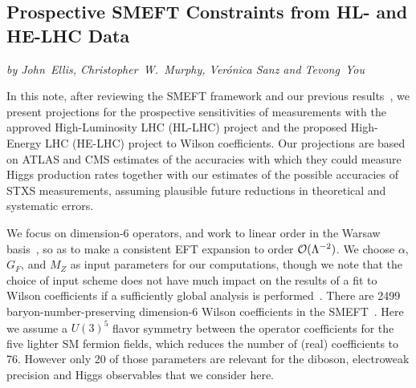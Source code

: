 \documentclass[../report.tex]{subfiles}
\begin{document}
\label{sec8:intro}






\subsection{Prospective SMEFT Constraints from HL- and HE-LHC Data %
}

\begin{center}
{\it by     John~Ellis,
Christopher~W.~Murphy,
Ver\'onica Sanz and
Tevong~You}
\end{center}





\label{sec8:smeft}

In this note, after reviewing the SMEFT framework and our previous results~\cite{Ellis:2018gqa,Ellis:2014dva, Ellis:2014jta, Murphy:2017omb}, we present projections for the
prospective sensitivities of measurements with the approved High-Luminosity LHC (HL-LHC) project and the proposed High-Energy LHC (HE-LHC) project
to Wilson coefficients. 
Our projections are based on ATLAS and CMS estimates of the accuracies with which they
could measure Higgs production rates together with our estimates of the possible accuracies of STXS
measurements, assuming plausible future reductions in theoretical and systematic errors.


We focus on dimension-6 operators, and work to linear order in the Warsaw basis~\cite{Grzadkowski:2010es},
so as to make a consistent EFT expansion to order ${\cal O}(\Lambda^{-2})$. 
We choose $\alpha$, $G_F$, and $M_Z$ as input parameters for our computations, though we note that
the choice of input scheme does not have much impact on the results of a fit to Wilson coefficients if a sufficiently global analysis is performed~\cite{Brivio:2017bnu}.
There are 2499 baryon-number-preserving dimension-6 Wilson coefficients in the SMEFT~\cite{Alonso:2013hga}.
Here we assume a $U(3)^5$ flavor symmetry between the operator coefficients for the five lighter SM fermion fields,
which reduces the number of (real) coefficients to 76.
However only 20 of those parameters are relevant for the diboson, electroweak precision and Higgs observables that we consider here.
\end{document}
